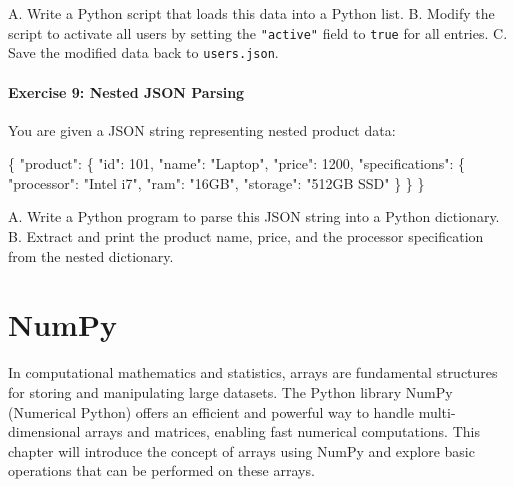 \documentclass[
  letterpaper,
  DIV=11,
  numbers=noendperiod]{scrreprt}
\newenvironment{Shaded}{\begin{snugshade}}{\end{snugshade}}
\newcommand{\DataTypeTok}[1]{\textcolor[rgb]{0.68,0.00,0.00}{#1}}
\newcommand{\DecValTok}[1]{\textcolor[rgb]{0.68,0.00,0.00}{#1}}
\newcommand{\FunctionTok}[1]{\textcolor[rgb]{0.28,0.35,0.67}{#1}}
\newcommand{\StringTok}[1]{\textcolor[rgb]{0.13,0.47,0.30}{#1}}
\begin{document}
A. Write a Python script that loads this data into a Python list. B.
Modify the script to activate all users by setting the \texttt{"active"}
field to \texttt{true} for all entries. C. Save the modified data back
to \texttt{users.json}.

\hypertarget{exercise-9-nested-json-parsing}{%
\subsubsection{Exercise 9: Nested JSON
Parsing}\label{exercise-9-nested-json-parsing}}

You are given a JSON string representing nested product data:

\begin{Shaded}
\begin{Highlighting}[]
\FunctionTok{\{}
    \DataTypeTok{"product"}\FunctionTok{:} \FunctionTok{\{}
        \DataTypeTok{"id"}\FunctionTok{:} \DecValTok{101}\FunctionTok{,}
        \DataTypeTok{"name"}\FunctionTok{:} \StringTok{"Laptop"}\FunctionTok{,}
        \DataTypeTok{"price"}\FunctionTok{:} \DecValTok{1200}\FunctionTok{,}
        \DataTypeTok{"specifications"}\FunctionTok{:} \FunctionTok{\{}
            \DataTypeTok{"processor"}\FunctionTok{:} \StringTok{"Intel i7"}\FunctionTok{,}
            \DataTypeTok{"ram"}\FunctionTok{:} \StringTok{"16GB"}\FunctionTok{,}
            \DataTypeTok{"storage"}\FunctionTok{:} \StringTok{"512GB SSD"}
        \FunctionTok{\}}
    \FunctionTok{\}}
\FunctionTok{\}}
\end{Highlighting}
\end{Shaded}

A. Write a Python program to parse this JSON string into a Python
dictionary. B. Extract and print the product name, price, and the
processor specification from the nested dictionary.


\hypertarget{sec-numpy}{%
\chapter{NumPy}\label{sec-numpy}}

In computational mathematics and statistics, arrays are fundamental
structures for storing and manipulating large datasets. The Python
library NumPy (Numerical Python) offers an efficient and powerful way to
handle multi-dimensional arrays and matrices, enabling fast numerical
computations. This chapter will introduce the concept of arrays using
NumPy and explore basic operations that can be performed on these
arrays.
\end{document}
